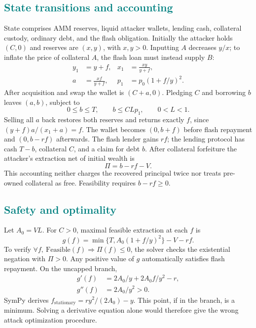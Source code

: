 \documentclass[conference]{IEEEtran}
\begin{document}
\subsection{\textcolor{Teal}{State transitions and accounting}}
State comprises AMM reserves, liquid attacker wallets, lending cash, collateral
custody, ordinary debt, and the flash obligation. Initially the attacker holds
$(C,0)$ and reserves are $(x,y)$, with $x,y>0$. Inputting $A$ decreases $y/x$;
to inflate the price of collateral $A$, the flash loan must instead supply $B$:
\begin{align}
y_1&=y+f,&x_1&=\frac{xy}{y+f},\\
a&=\frac{xf}{y+f},&p_1&=p_0(1+f/y)^2.
\end{align}
After acquisition and swap the wallet is $(C+a,0)$. Pledging $C$ and borrowing
$b$ leaves $(a,b)$, subject to
\begin{equation}0\leq b\leq T,\qquad b\leq C L p_1,\qquad 0<L<1.\end{equation}
Selling all $a$ back restores both reserves and returns exactly $f$, since
$(y+f)a/(x_1+a)=f$. The wallet becomes $(0,b+f)$ before flash repayment and
$(0,b-rf)$ afterwards. The flash lender gains $rf$; the lending protocol has
cash $T-b$, collateral $C$, and a claim for debt $b$. After collateral
forfeiture the attacker's extraction net of initial wealth is
\begin{equation}\Pi=b-rf-V.\end{equation}
This accounting neither charges the recovered principal twice nor treats
pre-owned collateral as free. Feasibility requires $b-rf\geq0$.

\subsection{\textcolor{Teal}{Safety and optimality}}
Let $A_0=VL$. For $C>0$, maximal feasible extraction at each $f$ is
\begin{equation}g(f)=\min\{T,A_0(1+f/y)^2\}-V-rf.\end{equation}
To verify $\forall f,\ \mathrm{Feasible}(f)\Rightarrow\Pi(f)\leq0$, the
solver checks the existential negation with $\Pi>0$. Any positive value of
$g$ automatically satisfies flash repayment. On the uncapped branch,
\begin{align}
g'(f)&=2A_0/y+2A_0 f/y^2-r,\\
g''(f)&=2A_0/y^2>0.
\end{align}
SymPy derives $f_{\mathrm{stationary}}=ry^2/(2A_0)-y$. This point, if in
the branch, is a minimum. Solving a derivative equation alone would therefore
give the wrong attack optimization procedure.
\end{document}
